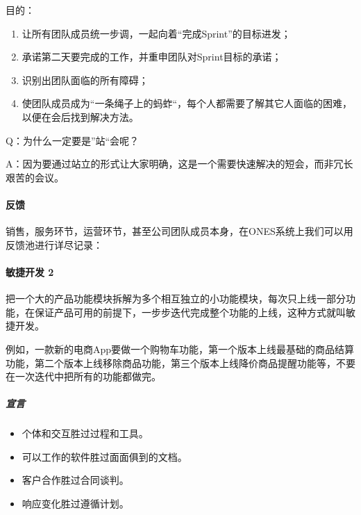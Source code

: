 \documentclass[letterpaper,11pt,english]{sphinxmanual}
\begin{document}
目的：
\begin{enumerate}
%
\item {} 
让所有团队成员统一步调，一起向着“完成Sprint”的目标进发；

\item {} 
承诺第二天要完成的工作，并重申团队对Sprint目标的承诺；

\item {} 
识别出团队面临的所有障碍；

\item {} 
使团队成员成为“一条绳子上的蚂蚱“，每个人都需要了解其它人面临的困难，以便在会后找到解决方法。

\end{enumerate}

Q：为什么一定要是”站“会呢？

A：因为要通过站立的形式让大家明确，这是一个需要快速解决的短会，而非冗长艰苦的会议。


\paragraph{反馈}
\label{\detokenize{chapter_project/Scrum:id5}}
销售，服务环节，运营环节，甚至公司团队成员本身，在ONES系统上我们可以用反馈池进行详尽记录：


\paragraph{敏捷开发 2\sphinxfootnotemark[278]}
\label{\detokenize{chapter_project/Scrum:id6}}%
\begin{footnotetext}[278]\sphinxAtStartFootnote
{}
%
\end{footnotetext}\ignorespaces 
把一个大的产品功能模块拆解为多个相互独立的小功能模块，每次只上线一部分功能，在保证产品可用的前提下，一步步迭代完成整个功能的上线，这种方式就叫敏捷开发。
%
\begin{footnote}[279]\sphinxAtStartFootnote
{}
%
\end{footnote}

例如，一款新的电商App要做一个购物车功能，第一个版本上线最基础的商品结算功能，第二个版本上线移除商品功能，第三个版本上线降价商品提醒功能等，不要在一次迭代中把所有的功能都做完。


\subparagraph{宣言}
\label{\detokenize{chapter_project/Scrum:id7}}\begin{itemize}
\item {} 
个体和交互胜过过程和工具。

\item {} 
可以工作的软件胜过面面俱到的文档。

\item {} 
客户合作胜过合同谈判。

\item {} 
响应变化胜过遵循计划。

\end{itemize}
\end{document}

